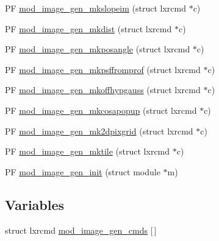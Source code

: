\begin{DoxyCompactItemize}
P\+F \hyperlink{image__gen-util_8c_a2ae4393654913c334053966b038c1e51}{mod\+\_\+image\+\_\+gen\+\_\+mkslopeim} (struct lxrcmd $\ast$c)
\item 
P\+F \hyperlink{image__gen-util_8c_abe4d5f47d07a88f8471d7fd98ea0088e}{mod\+\_\+image\+\_\+gen\+\_\+mkdist} (struct lxrcmd $\ast$c)
\item 
P\+F \hyperlink{image__gen-util_8c_a6f6b1ee7da2f1bf0f5dc75a09527333f}{mod\+\_\+image\+\_\+gen\+\_\+mkposangle} (struct lxrcmd $\ast$c)
\item 
P\+F \hyperlink{image__gen-util_8c_a14e84bbb654ac751fdd712ce247164b0}{mod\+\_\+image\+\_\+gen\+\_\+mkpsffromprof} (struct lxrcmd $\ast$c)
\item 
P\+F \hyperlink{image__gen-util_8c_ae821234a9154b6d81e509af455a602e6}{mod\+\_\+image\+\_\+gen\+\_\+mkoffhypgauss} (struct lxrcmd $\ast$c)
\item 
P\+F \hyperlink{image__gen-util_8c_a42da0c73d4d1136a5014c3047e12fa30}{mod\+\_\+image\+\_\+gen\+\_\+mkcosapopup} (struct lxrcmd $\ast$c)
\item 
P\+F \hyperlink{image__gen-util_8c_a2184de39a978f1cb17f72ccec538b5ce}{mod\+\_\+image\+\_\+gen\+\_\+mk2dpixgrid} (struct lxrcmd $\ast$c)
\item 
P\+F \hyperlink{image__gen-util_8c_a3860c261494668ad27c3d28f4df86ed5}{mod\+\_\+image\+\_\+gen\+\_\+mktile} (struct lxrcmd $\ast$c)
\item 
P\+F \hyperlink{image__gen-util_8c_a39f7d02a1dd93431130cc46b2ea9d12d}{mod\+\_\+image\+\_\+gen\+\_\+init} (struct module $\ast$m)
\end{DoxyCompactItemize}
\subsection*{Variables}
\begin{DoxyCompactItemize}
\item 
struct lxrcmd \hyperlink{image__gen-util_8c_a834a38cb923e0cb0137c34b26f209fb2}{mod\+\_\+image\+\_\+gen\+\_\+cmds} \mbox{[}$\,$\mbox{]}
\end{DoxyCompactItemize}


